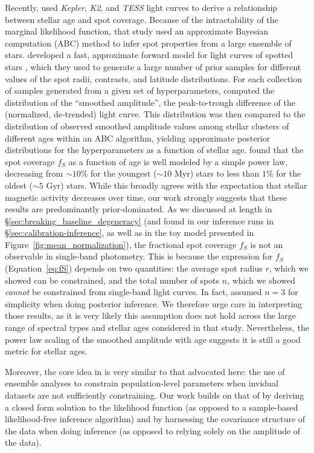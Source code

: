 \documentclass[modern]{aastex62}
\begin{document}
Recently, \citet{Morris2020} used \emph{Kepler}, \emph{K2}, and \emph{TESS}
light curves to derive a relationship between stellar age and spot
coverage. Because of the intractability of the marginal likelihood function,
that study used an approximate Bayesian computation (ABC) method to
infer spot properties from a large ensemble of stars. \citet{Morris2020}
developed a fast, approximate forward model for light curves of spotted stars
\citep[\textsf{fleck};][]{Morris2020b}, which they used to generate a large
number of prior samples for different values of the spot radii, contrasts,
and latitude distributions. For each collection of samples generated from a
given set of hyperparameters, \citet{Morris2020} computed the distribution of
the ``smoothed amplitude'',
the peak-to-trough difference of the (normalized, de-trended) light curve.
This distribution was then compared to the distribution of observed
smoothed amplitude values among stellar clusters of different ages
within an ABC algorithm, yielding approximate
posterior distributions for the hyperparameters as a function of
stellar age. \citet{Morris2020} found that the spot coverage $f_S$ as a
function of age is well modeled by a simple power law, decreasing from
${\sim}10\%$ for the youngest (${\sim}10$ Myr) stars
to less than $1\%$ for the oldest (${\sim}5$ Gyr) stars.
%
While this broadly agrees with the expectation that stellar
magnetic activity decreases over time, our work strongly suggests
that these results are predominantly prior-dominated. As we discussed
at length
in \S\ref{sec:breaking_baseline_degeneracy} (and found in our inference
runs in \S\ref{sec:calibration-inference}, as well as in the toy
model presented in Figure~\ref{fig:mean_normalization}), the fractional
spot coverage $f_S$ is not an observable in single-band photometry.
%
This is because the expression for $f_S$ (Equation~\ref{eq:fS}) depends on
two quantities: the average spot radius $r$, which we showed can be
constrained, and the total number of spots $n$, which
we showed \emph{cannot} be constrained from single-band light curves.
%
In fact, \citet{Morris2020} assumed $n=3$ for simplicity when doing
posterior inference. We therefore urge care in interpreting those results,
as it is very likely this assumption does not hold across the large
range of spectral types and stellar ages considered in that study.
Nevertheless, the power law scaling of the smoothed amplitude with
age suggests it is still a good metric for stellar ages.

Moreover, the core idea in \citet{Morris2020}
\citep[and in related studies such as][]{Jackson2013}
is very similar
to that advocated here: the use of ensemble analyses to constrain population-level
parameters when invidual datasets are not sufficiently constraining.
Our work builds on that of \citet{Morris2020} by deriving a closed form
solution to the likelihood function (as opposed to a sample-based
likelihood-free inference algorithm) and by harnessing the covariance
structure of the data when doing inference (as opposed to relying solely
on the amplitude of the data).
\end{document}
